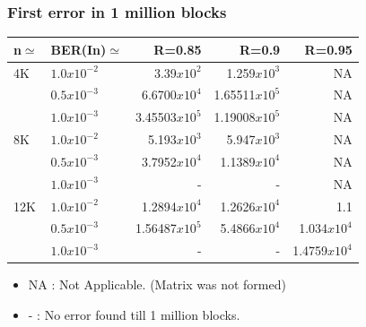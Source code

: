 \documentclass[xcolor=dvipsname]
{beamer}
\begin{document}
\begin{frame}[t] 
\frametitle{First error in 1 million blocks}

\begin{table}[]
\centering
\begin{tabular}{|l|l|r|r|r|}
\hline
n$\simeq$   & BER(In)$\simeq$    & R=0.85  & R=0.9 & R=0.95 \\ \hline
4K  & $1.0x10^{-2}$        & 3.39$x10^{2}$           & 1.259$x10^{3}$        & NA      \\ 
    & $0.5x10^{-3}$        & 6.6700$x10^{4}$        & 1.65511$x10^{5}$               & NA   \\ 
    & $1.0x10^{-3}$        & 3.45503$x10^{5}$        & 1.19008$x10^{5}$        & NA  \\ \hline
8K  & $1.0x10^{-2}$        & 5.193$x10^{3}$         & 5.947$x10^{3}$         & NA      \\ 
    & $0.5x10^{-3}$        & 3.7952$x10^{4}$        & 1.1389$x10^{4}$          & NA  \\ 
    & $1.0x10^{-3}$        & -             			& -               		 & NA             \\ \hline
12K & $1.0x10^{-2}$        & 1.2894$x10^{4}$        & 1.2626$x10^{4}$     & 1.1      \\ 
    & $0.5x10^{-3}$        & 1.56487$x10^{5}$      & 5.4866$x10^{4}$     & 1.034$x10^{4}$    \\ 
    & $1.0x10^{-3}$        & -			  			 & -           		& 1.4759$x10^{4}$   \\ \hline
      
\end{tabular}
\begin{itemize}
\item NA : Not Applicable. (Matrix was not formed)
\item -	 : No error found till 1 million blocks. 
\end{itemize}
\end{table}
\end{frame}		
\end{document}
